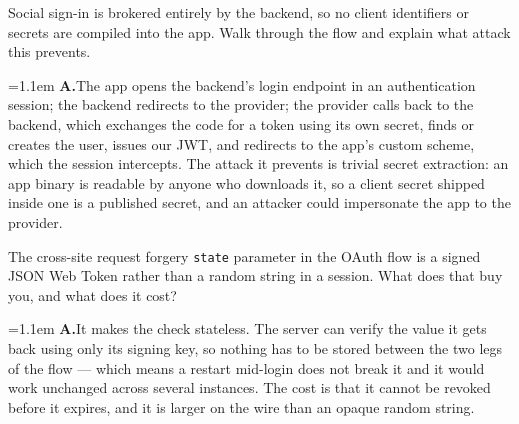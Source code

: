 \documentclass[11pt,a4paper]{article}
\newcommand{\code}[1]{\texttt{\small #1}}
\newcommand{\ans}[1]{%
  \par\vspace{0.32em}%
  \begingroup
  \small\color{answerink}%
  \leftskip=1.1em
  \noindent\textbf{\color{accent}A.}\hspace{0.45em}#1\par
  \endgroup
  \vspace{0.1em}%
}
\begin{document}
\begin{questions}[resume]
\item Social sign-in is brokered entirely by the backend, so no client identifiers
or secrets are compiled into the app. Walk through the flow and explain what
attack this prevents.
\ans{The app opens the backend's login endpoint in an authentication session; the
backend redirects to the provider; the provider calls back to the backend, which
exchanges the code for a token using its own secret, finds or creates the user,
issues our JWT, and redirects to the app's custom scheme, which the session
intercepts. The attack it prevents is trivial secret extraction: an app binary is
readable by anyone who downloads it, so a client secret shipped inside one is a
published secret, and an attacker could impersonate the app to the provider.}

\item The cross-site request forgery \code{state} parameter in the OAuth flow is a
signed JSON Web Token rather than a random string in a session. What does that
buy you, and what does it cost?
\ans{It makes the check stateless. The server can verify the value it gets back
using only its signing key, so nothing has to be stored between the two legs of
the flow --- which means a restart mid-login does not break it and it would work
unchanged across several instances. The cost is that it cannot be revoked before
it expires, and it is larger on the wire than an opaque random string.}

\end{questions}
\end{document}
